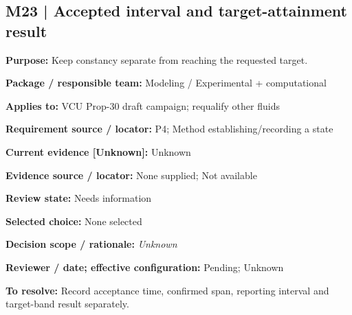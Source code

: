 \documentclass[11pt]{article}
\begin{document}
\par\noindent\begin{minipage}{\textwidth}\small\setlength{\parskip}{2pt}
\subsection*{M23 | Accepted interval and target-attainment result}
\textbf{Purpose:} Keep constancy separate from reaching the requested target.\par
\textbf{Package / responsible team:} Modeling / Experimental + computational\par
\textbf{Applies to:} VCU Prop-30 draft campaign; requalify other fluids\par
\textbf{Requirement source / locator:} P4; Method establishing/recording a state\par
\textbf{Current evidence [Unknown]:} Unknown\par
\textbf{Evidence source / locator:} None supplied; Not available\par
\textbf{Review state:} Needs information\par
\textbf{Selected choice:} None selected\par
\textbf{Decision scope / rationale:} \textit{Unknown}\par
\textbf{Reviewer / date; effective configuration:} Pending; Unknown\par
\textbf{To resolve:} Record acceptance time, confirmed span, reporting interval and target-band result separately.\par
\end{minipage}\par\vspace{5pt}
\end{document}
